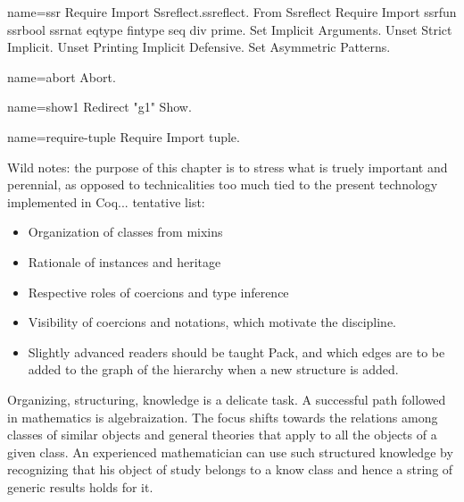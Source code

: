 \begin{coqdef}{name=ssr}
Require Import Ssreflect.ssreflect.
From Ssreflect Require Import ssrfun ssrbool ssrnat eqtype fintype seq div prime.
Set Implicit Arguments.
Unset Strict Implicit.
Unset Printing Implicit Defensive.
Set Asymmetric Patterns.
\end{coqdef}
\begin{coqdef}{name=abort}
Abort.
\end{coqdef}
\begin{coqdef}{name=show1}
Redirect "g1" Show.
\end{coqdef}
\begin{coqdef}{name=require-tuple}
Require Import tuple.
\end{coqdef}

Wild notes: the purpose of this chapter is to stress what is truely
important and perennial, as opposed to technicalities too much tied to
the present technology implemented in Coq... tentative list:
\begin{itemize}
\item Organization of classes from mixins
\item Rationale of instances and heritage
\item Respective roles of coercions and type inference
\item Visibility of coercions and notations, which motivate the
   discipline.
\item Slightly advanced readers should be taught Pack, and which edges
  are to be added to the graph of the hierarchy when a new
  structure is added.
\end{itemize}


Organizing, structuring, knowledge is a delicate task. A successful
path followed in mathematics is algebraization. The focus shifts
towards the relations among classes of similar objects and general
theories that apply to all the objects of a given class.
An experienced mathematician can use such structured
knowledge by recognizing that his object of study belongs to a know
class and hence a string of generic results holds for it.

